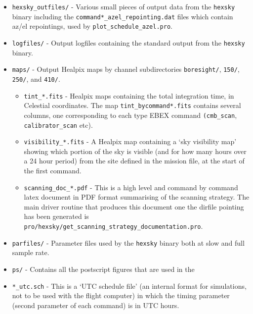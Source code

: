 \documentclass[a4paper,10pt]{article}
\begin{document}
\begin{itemize}
\item \texttt{hexsky\_outfiles/} - Various small pieces of output data
  from the \texttt{hexsky} binary including the
  \texttt{command*\_azel\_repointing.dat} files which contain az/el
  repointings, used by \texttt{plot\_schedule\_azel.pro}.

\item \texttt{logfiles/} - Output logfiles containing the standard
  output from the \texttt{hexsky} binary.


\item \texttt{maps/} - Output Healpix maps by channel subdirectories
  \texttt{boresight/}, \texttt{150/}, \texttt{250/}, and \texttt{410/}.

\begin{itemize}

\item \texttt{tint\_*.fits} - Healpix maps containing the total
  integration time, in Celestial coordinates. The map
  \texttt{tint\_bycommand*.fits} contains several columns, one
  corresponding to each type EBEX command \texttt{(cmb\_scan},
  \texttt{calibrator\_scan} etc).

\item \texttt{visibility\_*.fits} - A Healpix map containing a `sky
visibility map' showing which portion of the sky is visible (and for
how many hours over a 24 hour period) from the site defined in the mission
file, at the start of the first command.

\end{itemize}

\begin{itemize}

\item \texttt{scanning\_doc\_*.pdf} - This is a high level and command
by command latex document in PDF format summarising of the scanning
strategy. The main driver routine that produces this document one the
dirfile pointing has been generated is
\texttt{pro/hexsky/get\_scanning\_strategy\_documentation.pro}.

\end{itemize}

\item \texttt{parfiles/} - Parameter files used by the \texttt{hexsky}
  binary both at slow and full sample rate.

\item \texttt{ps/} - Contains all the postscript figures that are used in the

\item \texttt{*\_utc.sch} - This is a `UTC schedule file' (an internal
format for simulations, not to be used with the flight computer) in
which the timing parameter (second parameter of each command) is in UTC hours.



\end{itemize}
\end{document}
